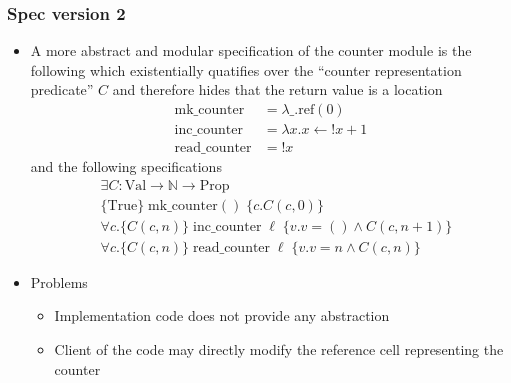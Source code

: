 \subsubsection{Spec version 2}
\begin{itemize}
	\item A more abstract and modular specification of the counter module is the following which existentially quatifies over the ``counter representation predicate'' $C$ and therefore hides that the return value is a location
  \begin{align*}
    \text{mk\_counter} &= \lambda \_.\text{ref}(0) \\
    \text{inc\_counter} &= \lambda x.x \leftarrow !x+1 \\
    \text{read\_counter} &= !x
  \end{align*}
  and the following specifications
  \begin{align*}
    &\exists C: \text{Val} \rightarrow \mathbb N \rightarrow \text{Prop} \\
    &\{\text{True}\} \; \text{mk\_counter}() \; \{c.C(c,0)\} \\
    &\forall c. \{C(c,n)\} \; \text{inc\_counter} \; \ell \; \{v.v = () \land C(c,n+1)\} \\
    &\forall c. \{C(c,n)\} \; \text{read\_counter} \; \ell \; \{v.v = n \land C(c,n)\}
  \end{align*}
  \item Problems
  \begin{itemize}
  	\item Implementation code does not provide any abstraction
    \item Client of the code may directly modify the reference cell representing the counter
  \end{itemize}
\end{itemize}

